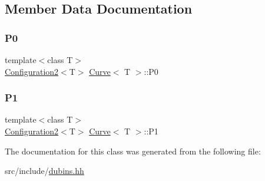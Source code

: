 \subsection{Member Data Documentation}
\mbox{\label{class_curve_a3a549faa5e4b5990da5d5cf67940fe24}} 
\subsubsection{\texorpdfstring{P0}{P0}}
{\footnotesize\ttfamily template$<$class T$>$ \\
\mbox{\hyperlink{class_configuration2}{Configuration2}}$<$T$>$ \mbox{\hyperlink{class_curve}{Curve}}$<$ T $>$\+::P0\hspace{0.3cm}{\ttfamily [protected]}}

\mbox{\label{class_curve_ab9eb1cded523a8de01c4514a4bf9e748}} 
\subsubsection{\texorpdfstring{P1}{P1}}
{\footnotesize\ttfamily template$<$class T$>$ \\
\mbox{\hyperlink{class_configuration2}{Configuration2}}$<$T$>$ \mbox{\hyperlink{class_curve}{Curve}}$<$ T $>$\+::P1\hspace{0.3cm}{\ttfamily [protected]}}



The documentation for this class was generated from the following file\+:\begin{DoxyCompactItemize}
\item 
src/include/\mbox{\hyperlink{dubins_8hh}{dubins.\+hh}}\end{DoxyCompactItemize}
